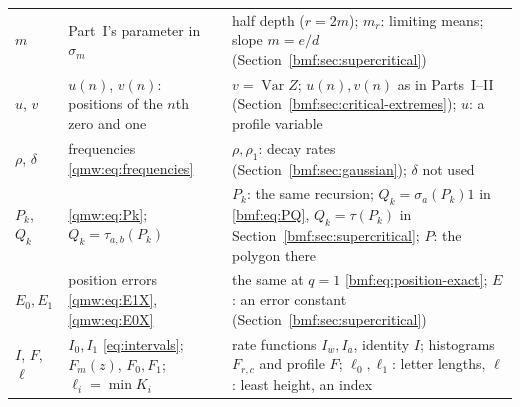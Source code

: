 \documentclass[11pt]{article}
\numberwithin{equation}{section}
\theoremstyle{definition}
\theoremstyle{remark}
\newcommand{\Var}{\operatorname{Var}}
\begin{document}
\begin{table}[htbp]
\begin{tabular}{>{\raggedright\arraybackslash}p{}>{\raggedright\arraybackslash}p{}>{\raggedright\arraybackslash}p{}}
$m$ & Part~I's parameter in $\sigma_m$ & half depth ($r=2m$); $m_r$: limiting means; slope $m=e/d$ (Section~\ref{bmf:sec:supercritical})\\
$u$, $v$ & $u(n)$, $v(n)$: positions of the $n$th zero and one & $v=\Var Z$; $u(n),v(n)$ as in Parts~I--II (Section~\ref{bmf:sec:critical-extremes}); $u$: a profile variable\\
$\rho$, $\delta$ & frequencies \eqref{qmw:eq:frequencies} & $\rho,\rho_1$: decay rates (Section~\ref{bmf:sec:gaussian}); $\delta$ not used\\
$P_k$, $Q_k$ & \eqref{qmw:eq:Pk}; $Q_k=\tau_{a,b}(P_k)$ & $P_k$: the same recursion; $Q_k=\sigma_a(P_k)1$ in \eqref{bmf:eq:PQ}, $Q_k=\tau(P_k)$ in Section~\ref{bmf:sec:supercritical}; $P$: the polygon there\\
$E_0,E_1$ & position errors \eqref{qmw:eq:E1X}, \eqref{qmw:eq:E0X} & the same at $q=1$ \eqref{bmf:eq:position-exact}; $E$: an error constant (Section~\ref{bmf:sec:supercritical})\\
$I$, $F$, $\ell$ & $I_0,I_1$ \eqref{eq:intervals}; $F_m(z)$, $F_0,F_1$; $\ell_i=\min K_i$ & rate functions $I_w,I_a$, identity $I$; histograms $F_{r,c}$ and profile $F$; $\ell_0,\ell_1$: letter lengths, $\ell$: least height, an index\\
\bottomrule
\end{tabular}
\end{table}
\end{document}
